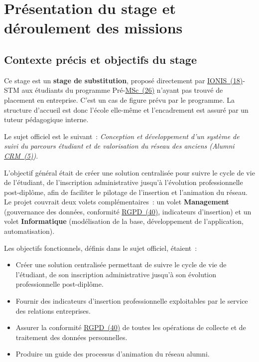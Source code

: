\documentclass[12pt,a4paper]{report}
\begin{document}
\chapter{Présentation du stage et déroulement des missions}

\section{Contexte précis et objectifs du stage}

Ce stage est un \textbf{stage de substitution}, proposé directement par \hyperlink{abbr-IONIS}{IONIS~(18)}-STM aux étudiants du programme Pré-\hyperlink{abbr-MSc}{MSc~(26)} n'ayant pas trouvé de placement en entreprise. C'est un cas de figure prévu par le programme. La structure d'accueil est donc l'école elle-même et l'encadrement est assuré par un tuteur pédagogique interne.

Le sujet officiel est le suivant~: \textit{\og{}Conception et développement d'un système de suivi du parcours étudiant et de valorisation du réseau des anciens (Alumni \hyperlink{abbr-CRM}{CRM~(5)})\fg{}}.

L'objectif général était de créer une solution centralisée pour suivre le \og{}cycle de vie\fg{} de l'étudiant, de l'inscription administrative jusqu'à l'évolution professionnelle post-diplôme, afin de faciliter le pilotage de l'insertion et l'animation du réseau. Le projet couvrait deux volets complémentaires~: un volet \textbf{Management} (gouvernance des données, conformité \hyperlink{abbr-RGPD}{RGPD~(40)}, indicateurs d'insertion) et un volet \textbf{Informatique} (modélisation de la base, développement de l'application, automatisation).

Les objectifs fonctionnels, définis dans le sujet officiel, étaient~:

\begin{itemize}
  \item Créer une solution centralisée permettant de suivre le cycle de vie de l'étudiant, de son inscription administrative jusqu'à son évolution professionnelle post-diplôme.
  \item Fournir des indicateurs d'insertion professionnelle exploitables par le service des relations entreprises.
  \item Assurer la conformité \hyperlink{abbr-RGPD}{RGPD~(40)} de toutes les opérations de collecte et de traitement des données personnelles.
  \item Produire un guide des processus d'animation du réseau alumni.
\end{itemize}
\end{document}
